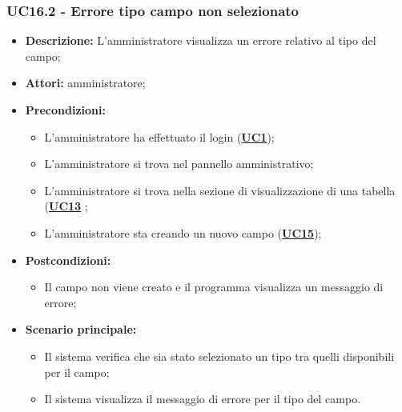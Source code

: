 \subsubsection{UC16.2 - Errore tipo campo non selezionato}
\label{sec:UC16.2}
\begin{itemize}
	\item \textbf{Descrizione:} L’amministratore visualizza un errore relativo al tipo del campo;
	\item \textbf{Attori:} amministratore;
	\item \textbf{Precondizioni:} 
	\begin{itemize}
		\item L’amministratore ha effettuato il login (\hyperref[sec:UC1]{\textbf{UC1}});
		\item L’amministratore si trova nel pannello amministrativo;
		\item L’amministratore si trova nella sezione di visualizzazione di una tabella (\hyperref[sec:UC13]{\textbf{UC13}} ;
		\item L’amministratore sta creando un nuovo campo (\hyperref[sec:UC15]{\textbf{UC15}});
	\end{itemize}
	\item \textbf{Postcondizioni:} 
	\begin{itemize}
		\item Il campo non viene creato e il programma visualizza un messaggio di errore;
	\end{itemize}
	\item \textbf{Scenario principale:} 
	\begin{itemize}
		\item Il sistema verifica che sia stato selezionato un tipo tra quelli disponibili per il campo;
		\item Il sistema visualizza il messaggio di errore per il tipo del campo.
	\end{itemize}
\end{itemize}

